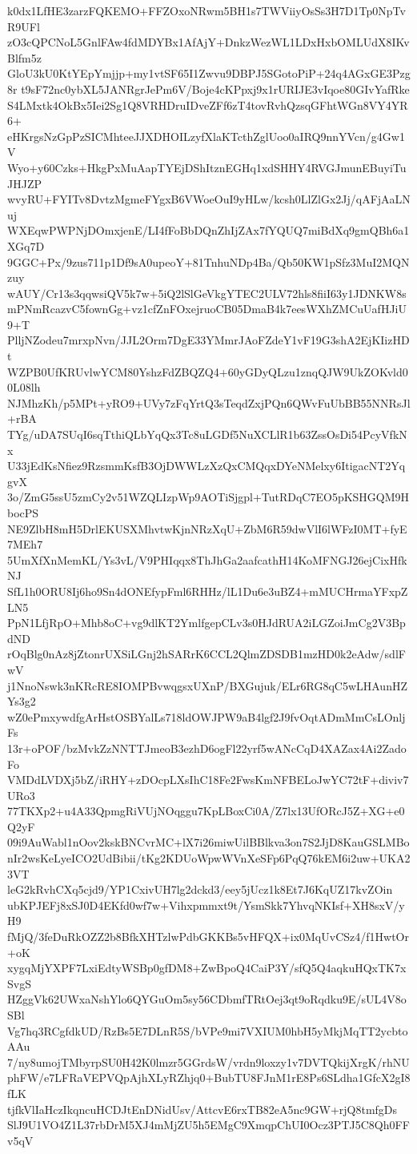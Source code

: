k0dx1LfHE3zarzFQKEMO+FFZOxoNRwm5BH1s7TWViiyOsSs3H7D1Tp0NpTvR9UFl
zO3cQPCNoL5GnlFAw4fdMDYBx1AfAjY+DnkzWezWL1LDxHxbOMLUdX8IKvBlfm5z
GloU3kU0KtYEpYmjjp+my1vtSF65I1Zwvu9DBPJ5SGotoPiP+24q4AGxGE3Pzg8r
t9sF72nc0ybXL5JANRgrJePm6V/Boje4cKPpxj9x1rURIJE3vIqoe80GIvYafRke
S4LMxtk4OkBx5Iei2Sg1Q8VRHDruIDveZFf6zT4tovRvhQzsqGFhtWGn8VY4YR6+
eHKrgsNzGpPzSICMhteeJJXDHOILzyfXlaKTcthZglUoo0aIRQ9nnYVcn/g4Gw1V
Wyo+y60Czks+HkgPxMuAapTYEjDShItznEGHq1xdSHHY4RVGJmunEBuyiTuJHJZP
wvyRU+FYITv8DvtzMgmeFYgxB6VWoeOuI9yHLw/kcsh0LlZlGx2Jj/qAFjAaLNuj
WXEqwPWPNjDOmxjenE/LI4fFoBbDQnZhIjZAx7fYQUQ7miBdXq9gmQBh6a1XGq7D
9GGC+Px/9zus711p1Df9sA0upeoY+81TnhuNDp4Ba/Qb50KW1pSfz3MuI2MQNzuy
wAUY/Cr13s3qqwsiQV5k7w+5iQ2lSlGeVkgYTEC2ULV72hls8fiiI63y1JDNKW8s
mPNmRcazvC5fownGg+vz1cfZnFOxejruoCB05DmaB4k7eesWXhZMCuUafHJiU9+T
PlljNZodeu7mrxpNvn/JJL2Orm7DgE33YMmrJAoFZdeY1vF19G3shA2EjKIizHDt
WZPB0UfKRUvlwYCM80YshzFdZBQZQ4+60yGDyQLzu1znqQJW9UkZOKvld00L08lh
NJMhzKh/p5MPt+yRO9+UVy7zFqYrtQ3sTeqdZxjPQn6QWvFuUbBB55NNRsJl+rBA
TYg/uDA7SUqI6sqTthiQLbYqQx3Tc8uLGDf5NuXCLlR1b63ZssOsDi54PcyVfkNx
U33jEdKsNfiez9RzsmmKsfB3OjDWWLzXzQxCMQqxDYeNMelxy6ItigacNT2YqgvX
3o/ZmG5ssU5zmCy2v51WZQLIzpWp9AOTiSjgpl+TutRDqC7EO5pKSHGQM9HbocPS
NE9ZlbH8mH5DrlEKUSXMhvtwKjnNRzXqU+ZbM6R59dwVlI6lWFzI0MT+fyE7MEh7
5UmXfXnMemKL/Ys3vL/V9PHIqqx8ThJhGa2aafcathH14KoMFNGJ26ejCixHfkNJ
SfL1h0ORU8Ij6ho9Sn4dONEfypFml6RHHz/lL1Du6e3uBZ4+mMUCHrmaYFxpZLN5
PpN1LfjRpO+Mhb8oC+vg9dlKT2YmlfgepCLv3s0HJdRUA2iLGZoiJmCg2V3BpdND
rOqBlg0nAz8jZtonrUXSiLGnj2hSARrK6CCL2QlmZDSDB1mzHD0k2eAdw/sdlFwV
j1NnoNswk3nKRcRE8IOMPBvwqgsxUXnP/BXGujuk/ELr6RG8qC5wLHAunHZYs3g2
wZ0ePmxywdfgArHstOSBYalLs718ldOWJPW9aB4lgf2J9fvOqtADmMmCsLOnljFs
13r+oPOF/bzMvkZzNNTTJmeoB3ezhD6ogFl22yrf5wANcCqD4XAZax4Ai2ZadoFo
VMDdLVDXj5bZ/iRHY+zDOcpLXsIhC18Fe2FwsKmNFBELoJwYC72tF+diviv7URo3
77TKXp2+u4A33QpmgRiVUjNOqggu7KpLBoxCi0A/Z7lx13UfORcJ5Z+XG+e0Q2yF
09i9AuWabl1nOov2kskBNCvrMC+lX7i26miwUilBBlkva3on7S2JjD8KauGSLMBo
nIr2wsKeLyeICO2UdBibii/tKg2KDUoWpwWVnXeSFp6PqQ76kEM6i2uw+UKA23VT
leG2kRvhCXq5cjd9/YP1CxivUH7lg2dckd3/eey5jUcz1k8Et7J6KqUZ17kvZOin
ubKPJEFj8xSJ0D4EKfd0wf7w+Vihxpmmxt9t/YsmSkk7YhvqNKIsf+XH8sxV/yH9
fMjQ/3feDuRkOZZ2b8BfkXHTzlwPdbGKKBs5vHFQX+ix0MqUvCSz4/f1HwtOr+oK
xygqMjYXPF7LxiEdtyWSBp0gfDM8+ZwBpoQ4CaiP3Y/sfQ5Q4aqkuHQxTK7xSvgS
HZggVk62UWxaNshYlo6QYGuOm5sy56CDbmfTRtOej3qt9oRqdku9E/sUL4V8oSBl
Vg7hq3RCgfdkUD/RzBs5E7DLnR5S/bVPe9mi7VXIUM0hbH5yMkjMqTT2ycbtoAAu
7/ny8umojTMbyrpSU0H42K0lmzr5GGrdsW/vrdn9loxzy1v7DVTQkijXrgK/rhNU
phFW/e7LFRaVEPVQpAjhXLyRZhjq0+BubTU8FJnM1rE8Ps6SLdha1GfcX2gI8fLK
tjfkVlIaHczIkqncuHCDJtEnDNidUsv/AttcvE6rxTB82eA5nc9GW+rjQ8tmfgDs
SlJ9U1VO4Z1L37rbDrM5XJ4mMjZU5h5EMgC9XmqpChUI0Ocz3PTJ5C8Qh0FFv5qV
